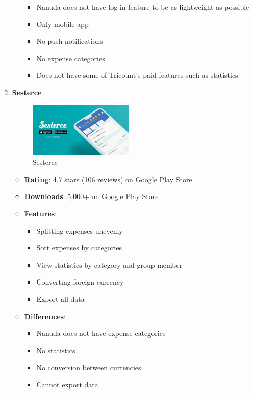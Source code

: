 \documentclass[conference]{IEEEtran}
\begin{document}
\begin{enumerate}
\begin{itemize}
\begin{itemize}
                    \item Nanuda does not have log in feature to be as lightweight as possible
                    \item Only mobile app
                    \item No push notifications
                    \item No expense categories
                    \item Does not have some of Tricount's paid features such as statistics
                \end{itemize}
        \end{itemize}
    \item\textbf{Sesterce} \\
        \begin{figure}[htbp]
            \centerline{\includegraphics[width=50mm,scale=0.5]{img/logo-sesterce.png}}
            \caption{Sesterce}
            \label{fig:my_label}
        \end{figure}
        \begin{itemize}
            \item \textbf{Rating}: 4.7 stars (106 reviews) on Google Play Store
            \item \textbf{Downloads}: 5,000+ on Google Play Store
            \item \textbf{Features}:
                \begin{itemize}
                    \item Splitting expenses unevenly
                    \item Sort expenses by categories
                    \item View statistics by category and group member
                    \item Converting foreign currency
                    \item Export all data
                \end{itemize}
            \item \textbf{Differences}:
                \begin{itemize}
                    \item Nanuda does not have expense categories
                    \item No statistics
                    \item No conversion between currencies
                    \item Cannot export data
                \end{itemize}
        \end{itemize}
\end{enumerate}
\end{document}
